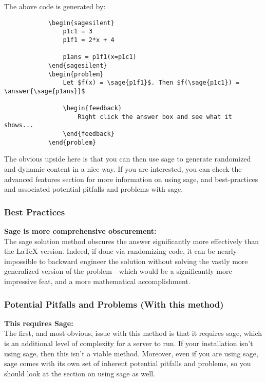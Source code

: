 \documentclass{ximera}
\begin{document}
        The above code is generated by:
        
        \begin{verbatim}
            \begin{sagesilent}
                p1c1 = 3
                p1f1 = 2*x + 4
                
                p1ans = p1f1(x=p1c1)
            \end{sagesilent}
            \begin{problem}
                Let $f(x) = \sage{p1f1}$. Then $f(\sage{p1c1}) = \answer{\sage{p1ans}}$
                
                \begin{feedback}
                    Right click the answer box and see what it shows...
                \end{feedback}
            \end{problem}
        \end{verbatim}
        
        The obvious upside here is that you can then use sage to generate randomized and dynamic content in a nice way. If you are interested, you can check the advanced features section for more information on using sage, and best-practices and associated potential pitfalls and problems with sage.
    
        \subsubsection*{Best Practices}
            \textbf{Sage is more comprehensive obscurement:}\\
                The sage solution method obscures the answer significantly more effectively than the LaTeX version. Indeed, if done via randomizing code, it can be nearly impossible to backward engineer the solution without solving the vastly more generalized version of the problem - which would be a significantly more impressive feat, and a more mathematical accomplishment.
        
        \subsubsection*{Potential Pitfalls and Problems (With this method)}
        
            \textbf{This requires Sage:}\\
                The first, and most obvious, issue with this method is that it requires sage, which is an additional level of complexity for a server to run. If your installation isn't using sage, then this isn't a viable method. Moreover, even if you are using sage, sage comes with its own set of inherent potential pitfalls and problems, so you should look at the section on using sage as well.
        
    
        
        

    
\end{document}
